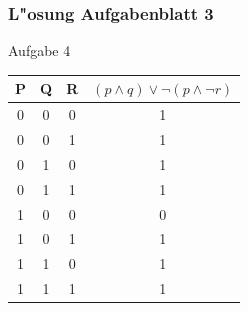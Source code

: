 \documentclass{beamer}
\begin{document}
\frame
{
	\frametitle{L"osung Aufgabenblatt 3}
	Aufgabe 4\\
	\begin{tabular}{c|c|c|c}
	P & Q & R & $(p \land q) \lor \lnot(p \land \lnot r)$ \\
	\hline
	0 & 0 & 0 & 1\\
	0 & 0 & 1 & 1\\
	0 & 1 & 0 & 1\\
	0 & 1 & 1 & 1\\
	1 & 0 & 0 & 0\\
	1 & 0 & 1 & 1\\
	1 & 1 & 0 & 1\\
	1 & 1 & 1 & 1\\
	\end{tabular}
}
\end{document}

